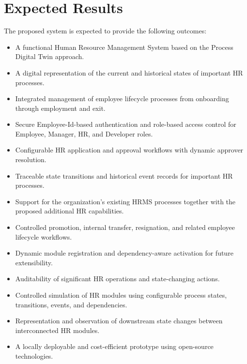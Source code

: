 \documentclass[12pt,a4paper]{article}
\begin{document}
\section{Expected Results}

The proposed system is expected to provide the following outcomes:

\begin{itemize}

    \item A functional Human Resource Management System based on
    the Process Digital Twin approach.

    \item A digital representation of the current and historical
    states of important HR processes.

    \item Integrated management of employee lifecycle processes
    from onboarding through employment and exit.

    \item Secure Employee-Id-based authentication and
    role-based access control for Employee, Manager, HR, and
    Developer roles.

    \item Configurable HR application and approval workflows with
    dynamic approver resolution.

    \item Traceable state transitions and historical event records
    for important HR processes.

    \item Support for the organization's existing HRMS processes
    together with the proposed additional HR capabilities.

    \item Controlled promotion, internal transfer, resignation,
    and related employee lifecycle workflows.

    \item Dynamic module registration and dependency-aware
    activation for future extensibility.

    \item Auditability of significant HR operations and
    state-changing actions.

    \item Controlled simulation of HR modules using configurable
    process states, transitions, events, and dependencies.

    \item Representation and observation of downstream state changes
    between interconnected HR modules.

    \item A locally deployable and cost-efficient prototype using
    open-source technologies.

\end{itemize}
\end{document}

